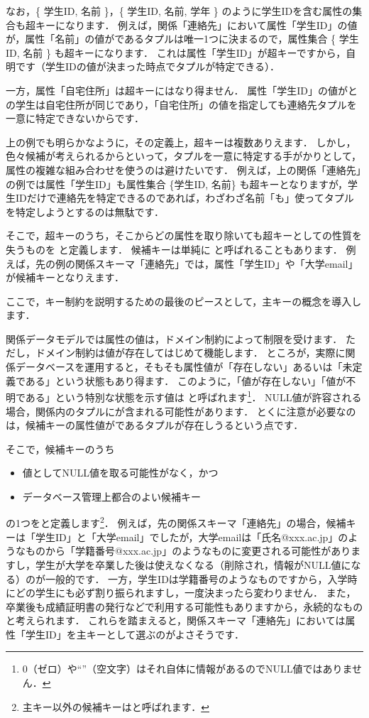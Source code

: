 なお，\{ 学生ID, 名前 \}，\{ 学生ID, 名前, 学年 \} のように学生IDを含む属性の集合も超キーになります．
例えば，関係「連絡先」において属性「学生ID」の値が，属性「名前」の値がであるタプルは唯一1つに決まるので，属性集合 \{ 学生ID, 名前 \} も超キーになります．
これは属性「学生ID」が超キーですから，自明です（学生IDの値が決まった時点でタプルが特定できる）．

一方，属性「自宅住所」は超キーにはなり得ません．
属性「学生ID」の値がとの学生は自宅住所が同じであり，「自宅住所」の値を指定しても連絡先タプルを一意に特定できないからです．

上の例でも明らかなように，その定義上，超キーは複数ありえます．
しかし，色々候補が考えられるからといって，タプルを一意に特定する手がかりとして，属性の複雑な組み合わせを使うのは避けたいです．
例えば，上の関係「連絡先」の例では属性「学生ID」も属性集合 \{学生ID, 名前\} も超キーとなりますが，学生IDだけで連絡先を特定できるのであれば，わざわざ名前「も」使ってタプルを特定しようとするのは無駄です．

そこで，超キーのうち，そこからどの属性を取り除いても超キーとしての性質を失うものを と定義します．
候補キーは単純に と呼ばれることもあります．
例えば，先の例の関係スキーマ「連絡先」では，属性「学生ID」や「大学email」が候補キーとなりえます．

ここで，キー制約を説明するための最後のピースとして，主キーの概念を導入します．

関係データモデルでは属性の値は，ドメイン制約によって制限を受けます．
ただし，ドメイン制約は値が存在してはじめて機能します．
ところが，実際に関係データベースを運用すると，そもそも属性値が「存在しない」あるいは「未定義である」という状態もあり得ます．
このように，「値が存在しない」「値が不明である」という特別な状態を示す値は と呼ばれます\footnote{0（ゼロ）や``''（空文字）はそれ自体に情報があるのでNULL値ではありません．}．
NULL値が許容される場合，関係内のタプルにが含まれる可能性があります．
とくに注意が必要なのは，候補キーの属性値がであるタプルが存在しうるという点です．

そこで，候補キーのうち
\begin{itemize}
    \item 値としてNULL値を取る可能性がなく，かつ
    \item データベース管理上都合のよい候補キー
\end{itemize}
の1つをと定義します\footnote{主キー以外の候補キーはと呼ばれます．}．
例えば，先の関係スキーマ「連絡先」の場合，候補キーは「学生ID」と「大学email」でしたが，大学emailは「氏名@xxx.ac.jp」のようなものから「学籍番号@xxx.ac.jp」のようなものに変更される可能性がありますし，学生が大学を卒業した後は使えなくなる（削除され，情報がNULL値になる）のが一般的です．
一方，学生IDは学籍番号のようなものですから，入学時にどの学生にも必ず割り振られますし，一度決まったら変わりません．
また，卒業後も成績証明書の発行などで利用する可能性もありますから，永続的なものと考えられます．
これらを踏まえると，関係スキーマ「連絡先」においては属性「学生ID」を主キーとして選ぶのがよさそうです．

